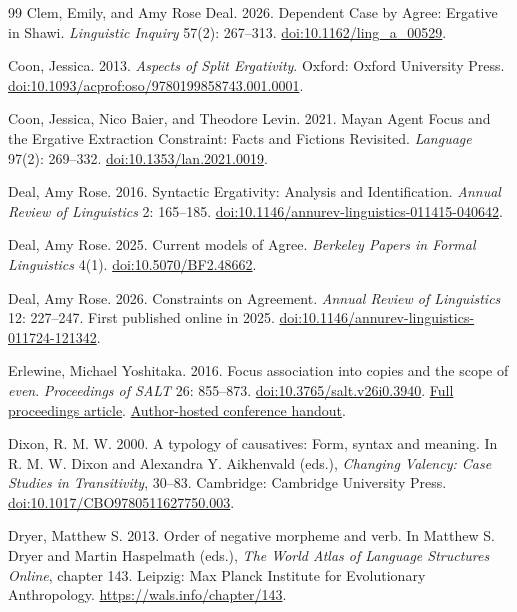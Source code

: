 \begin{thebibliography}{99}
Clem, Emily, and Amy Rose Deal. 2026.
Dependent Case by Agree: Ergative in Shawi.
\textit{Linguistic Inquiry} 57(2): 267--313.
\href{https://doi.org/10.1162/ling_a_00529}{doi:10.1162/ling\_a\_00529}.

Coon, Jessica. 2013.
\textit{Aspects of Split Ergativity}.
Oxford: Oxford University Press.
\href{https://doi.org/10.1093/acprof:oso/9780199858743.001.0001}{doi:10.1093/acprof:oso/9780199858743.001.0001}.

Coon, Jessica, Nico Baier, and Theodore Levin. 2021.
Mayan Agent Focus and the Ergative Extraction Constraint: Facts and Fictions Revisited.
\textit{Language} 97(2): 269--332.
\href{https://doi.org/10.1353/lan.2021.0019}{doi:10.1353/lan.2021.0019}.

Deal, Amy Rose. 2016.
Syntactic Ergativity: Analysis and Identification.
\textit{Annual Review of Linguistics} 2: 165--185.
\href{https://doi.org/10.1146/annurev-linguistics-011415-040642}{doi:10.1146/annurev-linguistics-011415-040642}.

Deal, Amy Rose. 2025.
Current models of Agree.
\textit{Berkeley Papers in Formal Linguistics} 4(1).
\href{https://doi.org/10.5070/BF2.48662}{doi:10.5070/BF2.48662}.

Deal, Amy Rose. 2026.
Constraints on Agreement.
\textit{Annual Review of Linguistics} 12: 227--247.
First published online in 2025.
\href{https://doi.org/10.1146/annurev-linguistics-011724-121342}{doi:10.1146/annurev-linguistics-011724-121342}.

Erlewine, Michael Yoshitaka. 2016.
Focus association into copies and the scope of \textit{even}.
\textit{Proceedings of SALT} 26: 855--873.
\href{https://doi.org/10.3765/salt.v26i0.3940}{doi:10.3765/salt.v26i0.3940}.
\href{https://journals.linguisticsociety.org/proceedings/index.php/SALT/article/download/26.855/3686/5352}{Full proceedings article}.
\href{https://mitcho.com/research/handout-even-salt.pdf}{Author-hosted conference handout}.

Dixon, R. M. W. 2000.
A typology of causatives: Form, syntax and meaning.
In R. M. W. Dixon and Alexandra Y. Aikhenvald (eds.),
\textit{Changing Valency: Case Studies in Transitivity}, 30--83.
Cambridge: Cambridge University Press.
\href{https://doi.org/10.1017/CBO9780511627750.003}{doi:10.1017/CBO9780511627750.003}.

Dryer, Matthew S. 2013.
Order of negative morpheme and verb.
In Matthew S. Dryer and Martin Haspelmath (eds.),
\textit{The World Atlas of Language Structures Online}, chapter 143.
Leipzig: Max Planck Institute for Evolutionary Anthropology.
\url{https://wals.info/chapter/143}.


\end{thebibliography}
